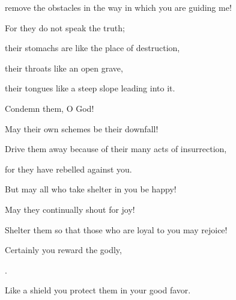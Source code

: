 {\par }{\Q remove the obstacles
in the way in which you are guiding me!
\par }{\Q {}For
they do
not
speak
the truth;

\par }{\Q their stomachs
are like the place of destruction,

\par }{\Q their throats
like an open
grave,
\par }{\Q their tongues
like a steep slope leading into it.
\par }{\Q {}Condemn
them, O God!
\par }{\Q May their own schemes
be their downfall!

\par }{\Q Drive
them away
because of their many
acts of insurrection,
\par }{\Q for
they have rebelled against you.
\par }{\Q {}But may all
who take shelter
in you be happy!

\par }{\Q May they continually
shout
for joy!

\par }{\Q Shelter
them so that those who are loyal
to you
may rejoice!
\par }{\Q {}Certainly
you
reward
the godly,

{}.
\par }{\Q Like a shield
you protect
them in your good favor.


\par }
